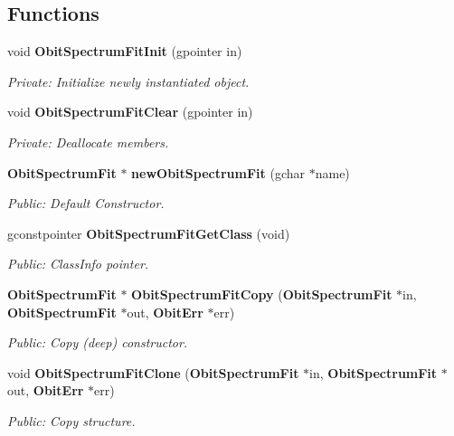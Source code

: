 \subsection*{Functions}
\begin{CompactItemize}
\item 
void {\bf Obit\-Spectrum\-Fit\-Init} (gpointer in)
\begin{CompactList}\small\item\em Private: Initialize newly instantiated object. \item\end{CompactList}\item 
void {\bf Obit\-Spectrum\-Fit\-Clear} (gpointer in)
\begin{CompactList}\small\item\em Private: Deallocate members. \item\end{CompactList}\item 
{\bf Obit\-Spectrum\-Fit} $\ast$ {\bf new\-Obit\-Spectrum\-Fit} (gchar $\ast$name)
\begin{CompactList}\small\item\em Public: Default Constructor. \item\end{CompactList}\item 
gconstpointer {\bf Obit\-Spectrum\-Fit\-Get\-Class} (void)
\begin{CompactList}\small\item\em Public: Class\-Info pointer. \item\end{CompactList}\item 
{\bf Obit\-Spectrum\-Fit} $\ast$ {\bf Obit\-Spectrum\-Fit\-Copy} ({\bf Obit\-Spectrum\-Fit} $\ast$in, {\bf Obit\-Spectrum\-Fit} $\ast$out, {\bf Obit\-Err} $\ast$err)
\begin{CompactList}\small\item\em Public: Copy (deep) constructor. \item\end{CompactList}\item 
void {\bf Obit\-Spectrum\-Fit\-Clone} ({\bf Obit\-Spectrum\-Fit} $\ast$in, {\bf Obit\-Spectrum\-Fit} $\ast$out, {\bf Obit\-Err} $\ast$err)
\begin{CompactList}\small\item\em Public: Copy structure. \item\end{CompactList}\item 

\end{CompactItemize}
